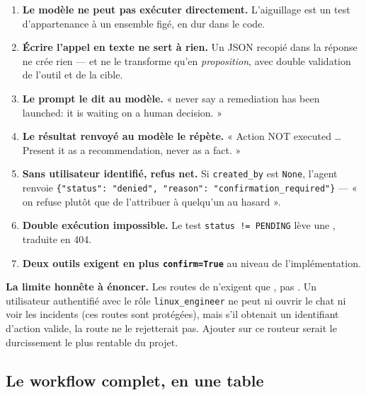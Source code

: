 \begin{enumerate}
  \item \textbf{Le modèle ne peut pas exécuter directement.} L'aiguillage est un
  test d'appartenance à un ensemble figé, en dur dans le code.
  \item \textbf{Écrire l'appel en texte ne sert à rien.} Un JSON recopié dans la
  réponse ne crée rien --- et  ne le transforme
  qu'en \emph{proposition}, avec double validation de l'outil et de la cible.
  \item \textbf{Le prompt le dit au modèle.} « never say a remediation has been
  launched: it is waiting on a human decision. »
  \item \textbf{Le résultat renvoyé au modèle le répète.} « Action NOT executed
  \ldots{} Present it as a recommendation, never as a fact. »
  \item \textbf{Sans utilisateur identifié, refus net.} Si \texttt{created\_by}
  est \texttt{None}, l'agent renvoie
  \texttt{\{"status": "denied", "reason": "confirmation\_required"\}} --- « on
  refuse plutôt que de l'attribuer à quelqu'un au hasard ».
  \item \textbf{Double exécution impossible.} Le test
  \texttt{status != PENDING} lève une , traduite en 404.
  \item \textbf{Deux outils exigent en plus \texttt{confirm=True}} au niveau de
  l'implémentation.
\end{enumerate}

\begin{warnbox}
\textbf{La limite honnête à énoncer.} Les routes de  n'exigent
que , pas . Un utilisateur authentifié
avec le rôle \texttt{linux\_engineer} ne peut ni ouvrir le chat ni voir les
incidents (ces routes sont protégées), mais s'il obtenait un identifiant
d'action valide, la route  ne le rejetterait pas. Ajouter
 sur ce routeur serait le durcissement le plus rentable du
projet.
\end{warnbox}

\subsection{Le workflow complet, en une table}


